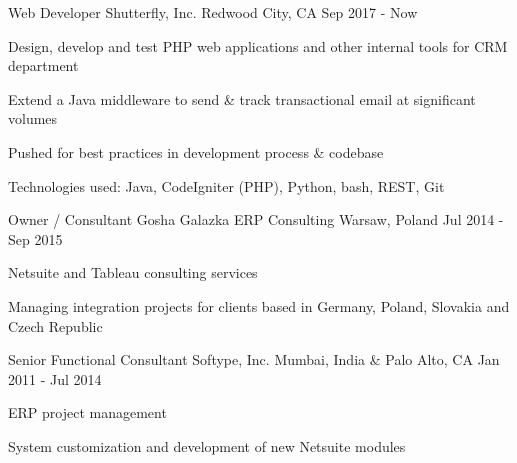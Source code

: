 
\begin{cventries}

	\cventry
		{Web Developer}
		{Shutterfly, Inc.} %
		{Redwood City, CA} %
		{Sep 2017 - Now} %
		{
			\begin{cvitems} %
				\item {Design, develop and test PHP web applications and other internal tools for CRM department}
				\item {Extend a Java middleware to send \& track transactional email at significant volumes}
				\item {Pushed for best practices in development process \& codebase}
				\item {Technologies used: Java, CodeIgniter (PHP), Python, bash, REST, Git}
			\end{cvitems}
		}

	\cventry
		{Owner / Consultant}
		{Gosha Galazka ERP Consulting} %
		{Warsaw, Poland} %
		{Jul 2014 - Sep 2015} %
		{
			\begin{cvitems} %
				\item {Netsuite and Tableau consulting services}
				\item {Managing integration projects for clients based in Germany, Poland, Slovakia and Czech Republic}
			\end{cvitems}
		}


	\cventry
		{Senior Functional Consultant}
		{Softype, Inc.} %
		{Mumbai, India \& Palo Alto, CA} %
		{Jan 2011 - Jul 2014} %
		{
			\begin{cvitems} %
				\item {ERP project management}
				\item {System customization and development of new Netsuite modules}
			\end{cvitems}
		}

\end{cventries}
